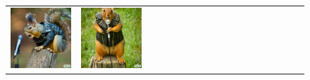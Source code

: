 \begin{figure}[ht!]
\begin{adjustwidth}{-0.8in}{-0.5in}
\begin{tabular}{cccccccccccccccccccc}
\multicolumn{2}{c}{\includegraphics[width=\threebythreecolwidth\textwidth]{figures/cherries/rock_squirrel_0.jpg}} &
\multicolumn{2}{c}{\includegraphics[width=\threebythreecolwidth\textwidth]{figures/cherries/rock_squirrel_1.jpg}} &

\end{tabular}
\end{adjustwidth}
\end{figure}
